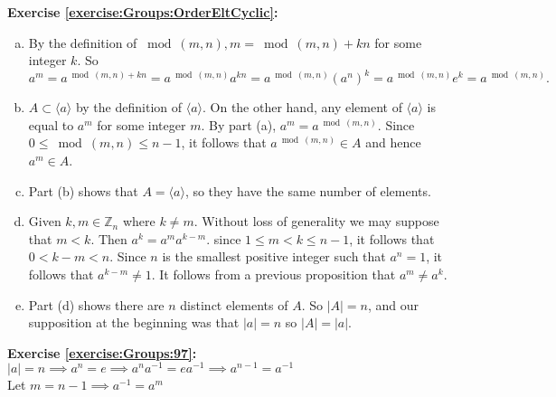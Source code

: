 \noindent\textbf{Exercise \ref{exercise:Groups:OrderEltCyclic}:}
\begin{enumerate}[(a)]
\item
By the definition of $\bmod(m,n), m = \bmod(m,n) + kn$ for some integer $k$.  So
$$a^m = a^{\bmod(m,n) + kn} =  a^{\bmod(m,n)}  a^{kn} =  a^{\bmod(m,n)}  (a^n)^k
= a^{\bmod(m,n)}  e^k = a^{\bmod(m,n)}.$$

\item
$A \subset \langle a \rangle$ by the definition of $\langle a \rangle$. On the other hand, any element of $\langle a \rangle$ is equal to $a^m$ for some integer $m$.  By part (a), $a^m= a^{\bmod(m,n)}$. Since $0 \le \bmod(m,n) \le n-1$, it follows that  $a^{\bmod(m,n)} \in A$ and hence $a^m \in A$.

\item 
Part (b) shows that $A = \langle a \rangle$, so they have the same number of elements.

\item
Given $k,m \in \mathbb{Z}_n$ where $k \neq m$. Without loss of generality we may suppose that $m < k$. Then $a^k = a^ma^{k-m}$.  since $1 \le m < k \le n-1$, it follows that $0<k-m < n$.  Since $n$ is the smallest positive integer such that $a^n=1$, it follows that $a^{k-m} \neq 1$.  It follows from a previous proposition that $a^m \neq a^k$.

\item
Part (d) shows there are $n$ distinct elements of $A$. So $|A|=n$, and our supposition at the beginning was that $|a|=n$ so $|A|=|a|$.
\end{enumerate}

\noindent\textbf{Exercise \ref{exercise:Groups:97}:}\\
$|a|= n \implies a^n = e \implies a^na^{-1}=ea^{-1}\implies a^{n-1}=a^{-1}$\\
Let $m=n-1 \implies a^{-1}=a^m$\\
\\

